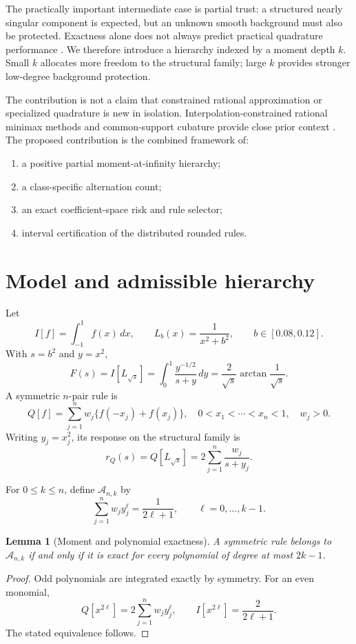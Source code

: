 \documentclass[preprint,12pt]{elsarticle}
\newtheorem{lemma}[theorem]{Lemma}
\theoremstyle{remark}
\begin{document}
The practically important intermediate case is partial trust: a
structured nearly singular component is expected, but an unknown smooth
background must also be protected. Exactness alone does not always
predict practical quadrature performance \cite{trefethen2021}. We
therefore introduce a hierarchy indexed by a moment depth \(k\). Small
\(k\) allocates more freedom to the structural family; large \(k\)
provides stronger low-degree background protection.

The contribution is not a claim that constrained rational approximation
or specialized quadrature is new in isolation. Interpolation-constrained
rational minimax methods and common-support cubature provide close prior
context \cite{zhang2025,bravo2023}. The proposed contribution is the
combined framework of:
\begin{enumerate}[label=(\roman*)]
\item a positive partial moment-at-infinity hierarchy;
\item a class-specific alternation count;
\item an exact coefficient-space risk and rule selector;
\item interval certification of the distributed rounded rules.
\end{enumerate}

\section{Model and admissible hierarchy}

Let
\[
I[f]=\int_{-1}^{1}f(x)\,dx,\qquad
L_b(x)=\frac{1}{x^2+b^2},\qquad b\in[0.08,0.12].
\]
With \(s=b^2\) and \(y=x^2\),
\[
F(s)=I[L_{\sqrt{s}}]
=\int_0^1\frac{y^{-1/2}}{s+y}\,dy
=\frac{2}{\sqrt{s}}\arctan\frac{1}{\sqrt{s}}.
\]
A symmetric \(n\)-pair rule is
\[
Q[f]=\sum_{j=1}^{n}w_j\{f(-x_j)+f(x_j)\},
\quad 0<x_1<\cdots<x_n<1,\quad w_j>0.
\]
Writing \(y_j=x_j^2\), its response on the structural family is
\[
r_Q(s)=Q[L_{\sqrt{s}}]
=2\sum_{j=1}^{n}\frac{w_j}{s+y_j}.
\]

For \(0\leq k\leq n\), define \(\mathcal A_{n,k}\) by
\[
\sum_{j=1}^{n}w_jy_j^\ell=\frac{1}{2\ell+1},
\qquad \ell=0,\ldots,k-1.
\]

\begin{lemma}[Moment and polynomial exactness]
A symmetric rule belongs to \(\mathcal A_{n,k}\) if and only if it is
exact for every polynomial of degree at most \(2k-1\).
\end{lemma}

\begin{proof}
Odd polynomials are integrated exactly by symmetry. For an even
monomial,
\[
Q[x^{2\ell}]=2\sum_{j=1}^{n}w_jy_j^\ell,
\qquad
I[x^{2\ell}]=\frac{2}{2\ell+1}.
\]
The stated equivalence follows.
\end{proof}
\end{document}
